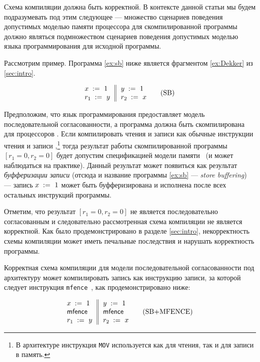 Схема компиляции должна быть корректной. 
В контексте данной статьи мы будем подразумевать под 
этим следующее --- множество сценариев поведения допустимых
моделью памяти процессора для скомпилированной программы 
должно являться подмножеством сценариев поведения допустимых 
моделью языка программирования для исходной программы. 

Рассмотрим пример. 
Программа \ref{ex:sb} ниже является 
фрагментом \ref{ex:Dekker} из \cref{sec:intro}.

\begin{equation*}
\inarrII{
   \writeInst{}{x}{1}   \\
   \readInst{}{r_1}{y}  \\
}{
  \writeInst{}{y}{1}   \\
  \readInst{}{r_2}{x}  \\
}
\tag{SB}\label{ex:sb}
\end{equation*}

Предположим, что язык программирования предоставляет 
модель последовательной согласованности, а программа
должна быть скомпилирована для процессоров \Intel. 
Если компилировать чтения и записи как обычные 
инструкции чтения и записи \Intel,\footnote{
В архитектуре \Intel инструкция \texttt{MOV} 
используется как для чтения, так и для записи в память.}
тогда результат работы скомпилированной программы
${[r_1=0, r_2=0]}$ будет допустим спецификацией модели памяти~\Intel
(и может наблюдаться на практике). 
Данный результат может появиться как результат 
\emph{буфферизации записи}
(отсюда и название программы \ref{ex:sb} --- \emph{store buffering}) ---  
запись ${x\;:=_{}\;1}$ может быть буфферизирована 
и исполнена после всех остальных инструкций программы. 

Отметим, что результат ${[r_1=0, r_2=0]}$ не является последовательно согласованным
и следовательно рассмотренная схема компиляции не является корректной. 
Как было продемонстрировано в разделе \cref{sec:intro}, 
некорректность схемы компиляции может иметь 
печальные последствия и нарушать корректность программы. 

Корректная схема компиляции для модели последовательной согласованности 
под архитектуру \Intel может компилировать 
запись как инструкцию записи, за которой следует 
инструкция \texttt{mfence}~\cite{Sewell-al:CACM10, Batty-al:POPL11}, 
как продемонстрировано ниже:

\begin{equation*}
\inarrII{
   \writeInst{}{x}{1}   \\
   \mfenceInst          \\
   \readInst{}{r_1}{y}  \\
}{
  \writeInst{}{y}{1}   \\
  \mfenceInst          \\
  \readInst{}{r_2}{x}  \\
}
\tag{SB+MFENCE}\label{ex:sb-mfence}
\end{equation*}

